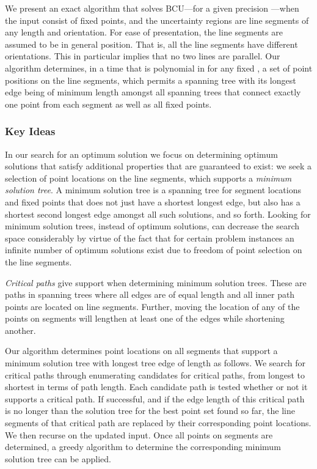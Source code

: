 We present an exact algorithm that solves BCU---for a given precision ---when the input consist of  fixed points, and  the uncertainty regions are  line segments of any length and orientation.  For ease of presentation, the line segments are assumed to be in general position. That is, all the line segments have different orientations. This in particular implies that no two lines are parallel. 
Our algorithm determines,  in a time that is polynomial in  for any fixed ,  a set of point positions on the line segments, which permits a spanning tree with its longest edge being of minimum length amongst all spanning trees that connect exactly one point from each segment as well as all fixed points.

\subsubsection*{Key Ideas}
In our search for an optimum solution we focus on determining optimum solutions that satisfy additional properties that are guaranteed to exist: we seek a selection of point locations on the line segments, which supports a {\em minimum solution tree}.  A minimum solution tree is a spanning tree for segment locations and fixed points that does not just have a shortest longest edge, but also has a shortest second longest edge amongst all such solutions, and so forth. Looking for minimum solution trees, instead of optimum solutions, can decrease the search space considerably by virtue of the fact that for certain problem instances an infinite number of optimum solutions exist due to freedom of point selection on the line segments.

{\em Critical paths} give support when determining minimum solution trees. These are paths in spanning trees where all edges are of equal length and all inner path points are located on line segments.
Further, moving the location of any of the points on segments will lengthen at least one of the edges while shortening another.

Our algorithm determines point locations on all segments that support a minimum solution tree with longest tree edge of length  as follows. We search for critical paths through enumerating candidates for critical paths, from longest to shortest in terms of path length. Each candidate path is tested whether or not it supports a critical path. If successful, and if the edge length of this critical path is no longer than the solution tree for the best point set found so far,  the line segments of that critical path are replaced by their corresponding point locations. We then recurse on the updated input.
Once all points on segments are determined, a greedy algorithm to determine the corresponding minimum solution tree can be applied.


